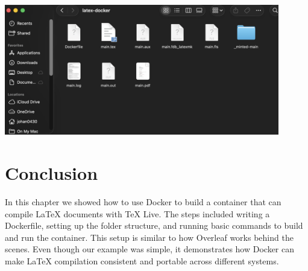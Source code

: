\begin{center}
\includegraphics[width=0.9\textwidth]{png/latexdocker.png}
\end{center}


\section{Conclusion}
In this chapter we showed how to use Docker to build a container that can
compile LaTeX documents with TeX Live. The steps included writing a Dockerfile,
setting up the folder structure, and running basic commands to build and run the
container. This setup is similar to how Overleaf works behind the scenes. Even
though our example was simple, it demonstrates how Docker can make LaTeX
compilation consistent and portable across different systems.